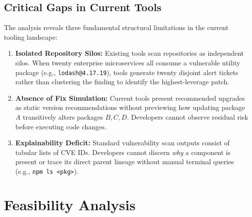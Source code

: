 \documentclass[12pt,a4paper,oneside]{report}
\begin{document}
\section{Critical Gaps in Current Tools}
The analysis reveals three fundamental structural limitations in the current tooling landscape:
\begin{enumerate}
    \item \textbf{Isolated Repository Silos:} Existing tools scan repositories as independent silos. When twenty enterprise microservices all consume a vulnerable utility package (e.g., \texttt{lodash@4.17.19}), tools generate twenty disjoint alert tickets rather than clustering the finding to identify the highest-leverage patch.
    \item \textbf{Absence of Fix Simulation:} Current tools present recommended upgrades as static version recommendations without previewing how updating package $A$ transitively alters packages $B, C, D$. Developers cannot observe residual risk before executing code changes.
    \item \textbf{Explainability Deficit:} Standard vulnerability scan outputs consist of tabular lists of CVE IDs. Developers cannot discern \textit{why} a component is present or trace its direct parent lineage without manual terminal queries (e.g., \texttt{npm ls <pkg>}).
\end{enumerate}

\chapter{Feasibility Analysis}
\end{document}
